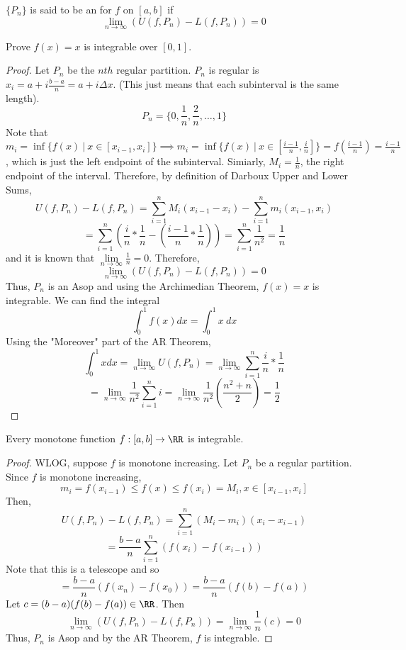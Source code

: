 \documentclass[12pt]{scrartcl}
\begin{document}
\begin{definition}
  $\{P_n\}$ is said to be an  for $f$
  on $[a,b]$ if
  \[\lim_{n\to\infty} (U(f, P_n) - L(f, P_n)) = 0\]
\end{definition}

\begin{example}
  Prove $f(x) = x$ is integrable over $[0, 1]$. 
  \begin{proof}
    Let $P_n$ be the $nth$ regular partition. $P_n$ is regular is 
    $x_i = a + i\frac{b-a}{n} = a + i\Delta x$. (This just means that each subinterval
    is the same length). 
    \[P_n = \{0, \frac{1}{n}, \frac{2}{n}, \ldots, 1\}\]
    Note that $m_i = \inf\{f(x) \ | \ x \in [x_{i-1}, x_i]\} \implies m_i = \inf\{f(x) \ | \ x \in [\frac{i-1}{n}, \frac{i}{n}]\} = f(\frac{i-1}{n}) = \frac{i-1}{n}$, 
    which is just the left endpoint of the subinterval. Simiarly, 
    $M_i = \frac{1}{n}$, the right endpoint of the interval. Therefore, 
    by definition of Darboux Upper and Lower Sums, 
    \[U(f, P_n) - L(f, P_n) = \sum_{i=1}^n M_i(x_{i-1} - x_i) - \sum_{i=1}^n m_i(x_{i-1}, x_i)\]
    \[= \sum_{i=1}^n (\frac{i}{n} * \frac{1}{n} - (\frac{i-1}{n} * \frac{1}{n}))=  \sum_{i=1}^n \frac{1}{n^2} = \frac{1}{n}\]
    and it is known that $\underset{n\to\infty}{\lim}\frac{1}{n} = 0$. Therefore, 
    \[\lim_{n\to\infty}(U(f, P_n) - L(f, P_n)) = 0\]
    Thus, $P_n$ is an Asop and using the Archimedian Theorem, $f(x) = x$ is integrable. We can find the 
    integral
    \[\int_0^1 f(x) dx = \int_0^1 x \ dx\]
    Using the "Moreover" part of the AR Theorem, 
    \[\int_0^1 x dx = \lim_{n\to\infty} U(f, P_n) = \lim_{n\to\infty}\sum_{i=1}^n \frac{i}{n} * \frac{1}{n}\]
    \[= \lim_{n\to\infty}\frac{1}{n^2}\sum_{i=1}^n i = \lim_{n\to\infty}\frac{1}{n^2}(\frac{n^2 + n}{2}) = \frac{1}{2}\]
  \end{proof}
\end{example}

\begin{theorem}
  Every monotone function $f: [a,b] \to \RR$ is integrable.
  \begin{proof}
    WLOG, suppose $f$ is monotone increasing. Let $P_n$ be a 
    regular partition. Since $f$ is monotone increasing, 
    \[m_i = f(x_{i-1}) \leq f(x) \leq f(x_i) = M_i, x \in [x_{i-1}, x_i]\]
    Then, 
    \[U(f, P_n) - L(f, P_n) = \sum_{i=1}^n (M_i - m_i) (x_i - x_{i-1})\]
    \[= \frac{b-a}{n}\sum_{i=1}^n (f(x_i) - f(x_{i-1}))\]
    Note that this is a telescope and so
    \[= \frac{b-a}{n}(f(x_n) - f(x_0)) = \frac{b-a}{n}(f(b) - f(a))\]
    Let $c = (b-a)(f(b) - f(a)) \in \RR$. Then 
    \[\lim_{n\to\infty}(U(f, P_n) - L(f, P_n)) = \lim_{n\to\infty}\frac{1}{n}(c) = 0\]
    Thus, $P_n$ is Asop and by the AR Theorem, $f$ is integrable.
  \end{proof}
\end{theorem}
\end{document}
